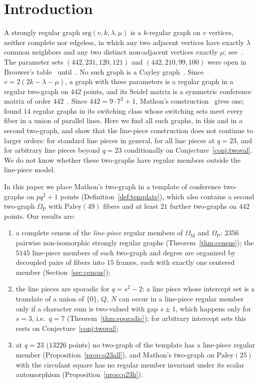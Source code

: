 \documentclass[11pt]{amsart}
\theoremstyle{definition}
\theoremstyle{remark}
\newcommand{\srg}{\mathrm{srg}}
\newcommand{\Pal}{\mathrm{Paley}}
\newcommand{\OM}{\Omega_{\mathrm M}}   %
\newcommand{\OP}{\Omega_{\mathrm P}}   %
\begin{document}
\section{Introduction}\label{sec:intro}
A strongly regular graph $\srg(v,k,\lambda,\mu)$ is a $k$-regular graph on $v$ vertices, neither complete nor edgeless, in
which any two adjacent vertices have exactly $\lambda$ common neighbors and any two distinct non-adjacent vertices exactly
$\mu$; see~\cite{BvM2022}. The parameter sets $(442,231,120,121)$ and $(442,210,99,100)$ were open in Brouwer's
table~\cite{BrouwerTable} until~\cite{Plummer442}. No such graph is a Cayley graph~\cite[Appendix~B]{NelsonSwartz2025}. Since
$v=2(2k-\lambda-\mu)$, a graph with these parameters is a regular graph in a regular two-graph on $442$ points, and its
Seidel matrix is a symmetric conference matrix of order $442$~\cite[\S\S10.3--10.4]{BH2012}. Since $442=9\cdot7^2+1$, Mathon's
construction~\cite{Mathon1978} gives one; \cite{Plummer442} found $14$ regular graphs in its switching class whose switching sets
meet every fiber in a union of parallel lines. Here we find all such graphs, in this and in a second two-graph, and
show that the line-piece construction does not continue to larger orders: for standard line pieces in general, for all
line pieces at $q=23$, and for arbitrary line pieces beyond $q=23$ conditionally on Conjecture~\ref{conj:twoval}. We do not know whether these two-graphs have regular
members outside the line-piece model.

In this paper we place Mathon's two-graph in a template of conference two-graphs on $pq^2+1$ points
(Definition~\ref{def:template}), which also contains a second two-graph $\OP$ with $\Pal(49)$ fibers and at least $21$ further
two-graphs on $442$ points. Our results are:
\begin{enumerate}
\item a complete census of the \emph{line-piece} regular members of $\OM$ and $\OP$: $2356$ pairwise non-isomorphic strongly
regular graphs (Theorem~\ref{thm:census}); the $5145$ line-piece members of each two-graph and degree are organized by
decoupled pairs of fibers into $15$ frames, each with exactly one centered member (Section~\ref{sec:census});
\item the line pieces are sporadic for $q=s^2-2$: a line piece whose intercept set is a translate of a union of
$\{0\}$, $Q$, $N$ can occur in a line-piece regular member only if a character sum is two-valued with gap $s\pm1$, which happens
only for $s=3$, i.e.\ $q=7$ (Theorem~\ref{thm:sporadic}); for arbitrary intercept sets this rests on
Conjecture~\ref{conj:twoval};
\item at $q=23$ ($13226$ points) no two-graph of the template has a line-piece regular member
(Proposition~\ref{prop:q23all}), and Mathon's two-graph on $\Pal(25)$ with the circulant square has no regular member
invariant under its scalar automorphism (Proposition~\ref{prop:q23h}).
\end{enumerate}
\end{document}
